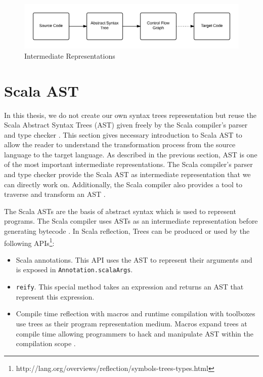 \begin{figure}[h!]
\centering
\includegraphics[width=0.8\linewidth]{figures/CompStructure}
\caption{Intermediate Representations}
\label{fig:Compiler}
\end{figure}

\section{Scala AST}
In this thesis, we do not create our own syntax trees representation but reuse the Scala Abstract Syntax Trees (AST) given freely by the Scala compiler's parser and type checker \cite{stocker2010scala}. This section gives necessary introduction to Scala AST to allow the reader to understand the transformation process from the source language to the target language. As described in the previous section, AST is one of the most important intermediate representations. The Scala compiler's parser and type checker provide the Scala AST as intermediate representation that we can directly work on. Additionally, the Scala compiler also provides a tool to traverse and transform an AST \cite{stocker2010scala}.

The Scala ASTs are the basis of abstract syntax which is used to represent programs. The Scala compiler uses ASTs as an intermediate representation before generating bytecode \cite{demarne2014scala}. In Scala reflection, Trees can be produced or used by the following APIs\footnote{http://lang.org/overviews/reflection/symbols-trees-types.html}:

\begin{itemize}
\item Scala annotations. This API uses the AST to represent their arguments and is exposed in \texttt{Annotation.scalaArgs}. 
\item \texttt{reify}. This special method takes an expression and returns an AST that represent this expression.
\item Compile time reflection with macros \cite{burmako2013scala} and runtime compilation with toolboxes use trees as their program representation medium. Macros expand trees at compile time allowing programmers to hack and manipulate AST within the compilation scope \cite{burmako2013scala}.
\end{itemize} 

